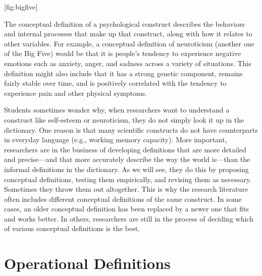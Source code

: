 \documentclass[]{book}
\theoremstyle{definition}
\theoremstyle{definition}
\theoremstyle{remark}
\begin{document}
{[}fig:bigfive{]}

The conceptual definition of a psychological construct describes the
behaviors and internal processes that make up that construct, along with
how it relates to other variables. For example, a conceptual definition
of neuroticism (another one of the Big Five) would be that it is
people's tendency to experience negative emotions such as anxiety,
anger, and sadness across a variety of situations. This definition might
also include that it has a strong genetic component, remains fairly
stable over time, and is positively correlated with the tendency to
experience pain and other physical symptoms.

Students sometimes wonder why, when researchers want to understand a
construct like self-esteem or neuroticism, they do not simply look it up
in the dictionary. One reason is that many scientific constructs do not
have counterparts in everyday language (e.g., working memory capacity).
More important, researchers are in the business of developing
definitions that are more detailed and precise---and that more
accurately describe the way the world is---than the informal definitions
in the dictionary. As we will see, they do this by proposing conceptual
definitions, testing them empirically, and revising them as necessary.
Sometimes they throw them out altogether. This is why the research
literature often includes different conceptual definitions of the same
construct. In some cases, an older conceptual definition has been
replaced by a newer one that fits and works better. In others,
researchers are still in the process of deciding which of various
conceptual definitions is the best.

\section{Operational Definitions}\label{operational-definitions}
\end{document}
